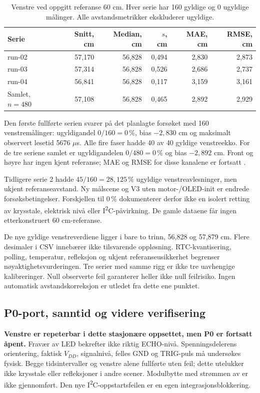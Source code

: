 \begin{table}[htbp]
\centering\small
\caption{Venstre ved oppgitt referanse 60 cm. Hver serie har 160 gyldige
og 0 ugyldige målinger. Alle avstandsmetrikker ekskluderer ugyldige.}
\begin{tabular}{lrrrrr}\toprule
Serie & Snitt, cm & Median, cm & \(s\), cm & MAE, cm & RMSE, cm\\\midrule
run-02 &57,170&56,828&0,494&2,830&2,873\\
run-03 &57,314&56,828&0,526&2,686&2,737\\
run-04 &56,841&56,828&0,117&3,159&3,161\\\midrule
Samlet, \(n=480\)&57,108&56,828&0,465&2,892&2,929\\\bottomrule
\end{tabular}
\label{tab:reference60}
\end{table}

Den første fullførte serien svarer på det planlagte forsøket med
160 venstremålinger: ugyldigandel \(0/160=0\,\%\), bias
\(-2{,}830\) cm og maksimalt observert lesetid 5676 \(\mu\)s.
Alle fire faser hadde 40 av 40 gyldige venstreekko.
For de tre seriene samlet er ugyldigandelen \(0/480=0\,\%\) og bias
\(-2{,}892\) cm. Front og høyre har ingen kjent referanse; MAE og
RMSE for disse kanalene er fortsatt .

Tidligere serie 2 hadde \(45/160=28{,}125\,\%\) ugyldige venstreavlesninger,
men ukjent referanseavstand. Ny målscene og V3 uten motor-/OLED-init
er endrede forsøksbetingelser. Forskjellen til 0\,\% dokumenterer
derfor ikke en isolert retting av krysstale, elektrisk nivå eller
I\textsuperscript{2}C-påvirkning. De gamle dataene får ingen
etterkonstruert 60 cm-referanse.

De nye gyldige venstreverdiene ligger i bare to trinn, 56,828 og
57,879 cm. Flere desimaler i CSV innebærer ikke tilsvarende oppløsning.
RTC-kvantisering, polling, temperatur, refleksjon og ukjent
referanseusikkerhet begrenser nøyaktighetsvurderingen.
Tre serier med samme rigg er ikke tre uavhengige kalibreringer.
Null observerte feil garanterer heller ikke null feilrisiko.
Ingen automatisk avstandskorreksjon er utledet fra dette ene punktet.

\subsection{P0-port, sanntid og videre verifisering}
\textbf{Venstre er repeterbar i dette stasjonære oppsettet, men P0 er
fortsatt åpent.} Fravær av LED bekrefter ikke riktig ECHO-nivå.
Spenningsdelerens orientering, faktisk \(V_{DD}\), signalnivå,
felles GND og TRIG-puls må undersøkes fysisk.
Begge tidsintervaller og venstre alene fullførte uten feil; dette
utelukker ikke krysstale eller refleksjoner i andre scener.
Modulbytte med strømmen av er ikke gjennomført. Den nye
I\textsuperscript{2}C-oppstartsfeilen er en egen integrasjonsblokkering.

